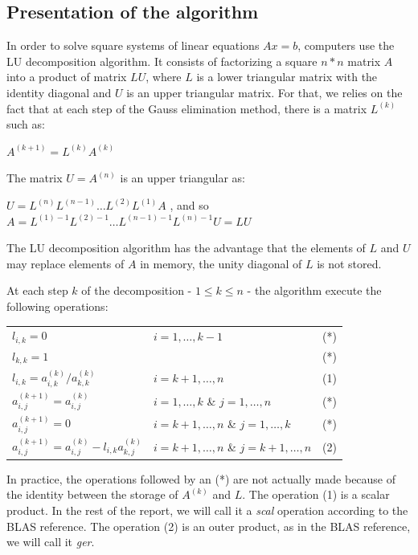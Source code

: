 \subsection*{Presentation of the algorithm}
In order to solve square systems of linear equations $Ax=b$, computers use the LU decomposition algorithm. It consists of factorizing a square $n*n$ matrix $A$  into a product of matrix $LU$, where $L$ is a lower triangular matrix with the identity diagonal and $U$ is an upper triangular matrix. For that, we relies on the fact that at each step of the Gauss elimination method, there is a matrix $L^{(k)}$ such as:
\begin{center}
$A^{(k+1)} = L^{(k)}A^{(k)}$
\end{center}
The matrix $U=A^{(n)}$ is an upper triangular as:
\begin{center}
$U=L^{(n)}L^{(n-1)}\dots L^{(2)}L^{(1)}A$ , and so\\
$A=L^{(1)-1}L^{(2)-1}\dots L^{(n-1)-1}L^{(n)-1}U=LU$
\end{center}
The LU decomposition algorithm has the advantage that the elements of $L$ and $U$ may replace elements of $A$ in memory, the unity diagonal of $L$ is not stored.

At each step $k$ of the decomposition - $1\leq k\leq n$ - the algorithm execute the following operations:
\begin{center}
\begin{tabular}{lll}
$l_{i,k} = 0$ & $i = 1,\dots , k-1$ & (*)\\
$l_{k,k} = 1$ & & (*)\\
$l_{i,k} = a_{i,k}^{(k)}/a_{k,k}^{(k)}$ & $i = k+1,\dots , n$ & (1)\\
$a_{i,j}^{(k+1)}=a_{i,j}^{(k)}$ & $i=1,\dots,k$ \& $j=1,\dots,n$ & (*)\\
$a_{i,j}^{(k+1)}=0$ & $i=k+1,\dots,n$ \& $j=1,\dots,k$ & (*)\\
$a_{i,j}^{(k+1)}=a_{i,j}^{(k)}-l_{i,k}a_{k,j}^{(k)}$ & $i=k+1,\dots,n$ \& $j=k+1,\dots,n$ & (2)\\
\end{tabular}
\end{center}
In practice, the operations followed by an (*) are not actually made because of the identity between the storage of $A^{(k)}$ and $L$. The operation (1) is a scalar product. In the rest of the report, we will call it a \emph{scal} operation according to the BLAS reference. The operation (2) is an outer product, as in the BLAS reference, we will call it \emph{ger}.

